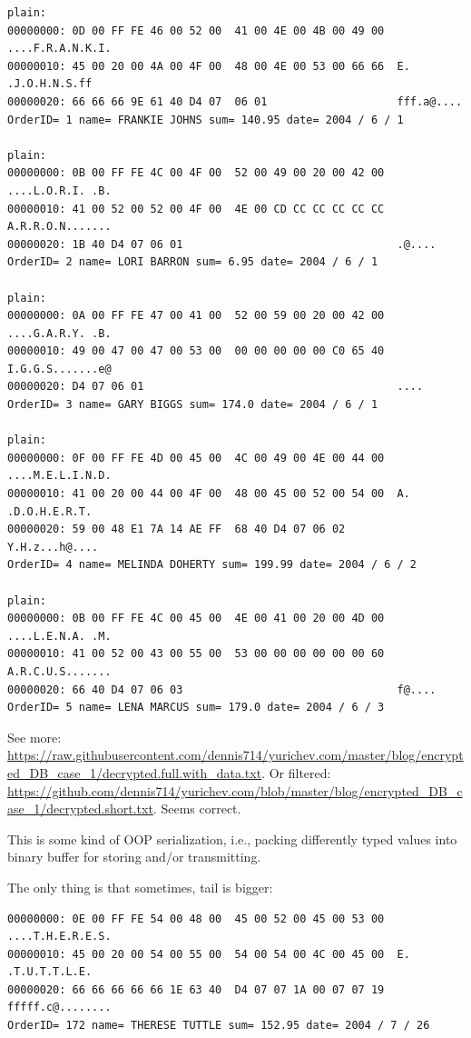 \begin{lstlisting}
plain:
00000000: 0D 00 FF FE 46 00 52 00  41 00 4E 00 4B 00 49 00  ....F.R.A.N.K.I.
00000010: 45 00 20 00 4A 00 4F 00  48 00 4E 00 53 00 66 66  E. .J.O.H.N.S.ff
00000020: 66 66 66 9E 61 40 D4 07  06 01                    fff.a@....
OrderID= 1 name= FRANKIE JOHNS sum= 140.95 date= 2004 / 6 / 1

plain:
00000000: 0B 00 FF FE 4C 00 4F 00  52 00 49 00 20 00 42 00  ....L.O.R.I. .B.
00000010: 41 00 52 00 52 00 4F 00  4E 00 CD CC CC CC CC CC  A.R.R.O.N.......
00000020: 1B 40 D4 07 06 01                                 .@....
OrderID= 2 name= LORI BARRON sum= 6.95 date= 2004 / 6 / 1

plain:
00000000: 0A 00 FF FE 47 00 41 00  52 00 59 00 20 00 42 00  ....G.A.R.Y. .B.
00000010: 49 00 47 00 47 00 53 00  00 00 00 00 00 C0 65 40  I.G.G.S.......e@
00000020: D4 07 06 01                                       ....
OrderID= 3 name= GARY BIGGS sum= 174.0 date= 2004 / 6 / 1

plain:
00000000: 0F 00 FF FE 4D 00 45 00  4C 00 49 00 4E 00 44 00  ....M.E.L.I.N.D.
00000010: 41 00 20 00 44 00 4F 00  48 00 45 00 52 00 54 00  A. .D.O.H.E.R.T.
00000020: 59 00 48 E1 7A 14 AE FF  68 40 D4 07 06 02        Y.H.z...h@....
OrderID= 4 name= MELINDA DOHERTY sum= 199.99 date= 2004 / 6 / 2

plain:
00000000: 0B 00 FF FE 4C 00 45 00  4E 00 41 00 20 00 4D 00  ....L.E.N.A. .M.
00000010: 41 00 52 00 43 00 55 00  53 00 00 00 00 00 00 60  A.R.C.U.S.......
00000020: 66 40 D4 07 06 03                                 f@....
OrderID= 5 name= LENA MARCUS sum= 179.0 date= 2004 / 6 / 3
\end{lstlisting}

See more: \url{https://raw.githubusercontent.com/dennis714/yurichev.com/master/blog/encrypted_DB_case_1/decrypted.full.with_data.txt}.
Or filtered: \url{https://github.com/dennis714/yurichev.com/blob/master/blog/encrypted_DB_case_1/decrypted.short.txt}.
Seems correct.

This is some kind of OOP serialization, i.e., packing differently typed values into binary buffer for storing and/or transmitting.


The only thing is that sometimes, tail is bigger:

\begin{lstlisting}
00000000: 0E 00 FF FE 54 00 48 00  45 00 52 00 45 00 53 00  ....T.H.E.R.E.S.
00000010: 45 00 20 00 54 00 55 00  54 00 54 00 4C 00 45 00  E. .T.U.T.T.L.E.
00000020: 66 66 66 66 66 1E 63 40  D4 07 07 1A 00 07 07 19  fffff.c@........
OrderID= 172 name= THERESE TUTTLE sum= 152.95 date= 2004 / 7 / 26
\end{lstlisting}

